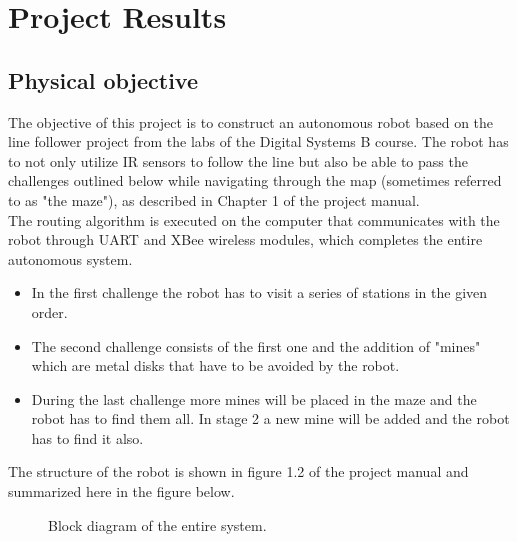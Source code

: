 \chapter{Project Results }

\section{Physical objective}
The objective of this project is to construct an autonomous robot based on the line follower project from the labs of the Digital Systems B course. The robot has to not only utilize IR sensors to follow the line but also be able to pass the challenges outlined below while navigating through the map (sometimes referred to as "the maze"), as described in Chapter 1 of the project manual.\\
The routing algorithm is executed on the computer that communicates with the robot through UART and XBee wireless modules, which completes the entire autonomous system.\\

\begin{itemize}
    \item In the first challenge the robot has to visit a series of stations in the given order.
    \item The second challenge consists of the first one and the addition of "mines" which are metal disks that have to be avoided by the robot.
    \item During the last challenge more mines will be placed in the maze and the robot has to find them all. In stage 2 a new mine will be added and the robot has to find it also. 
\end{itemize}
The structure of the robot is shown in figure 1.2 of the project manual and summarized here in the figure below.

\begin{figure}[h!]
    \centering
    \caption{Block diagram of the entire system.}
    \label{fig:block}
\end{figure}

